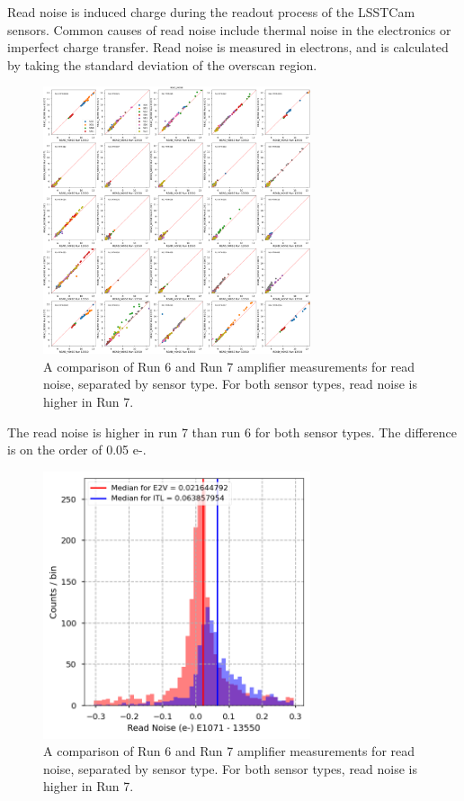 Read noise is induced charge during the readout process of the LSSTCam sensors. Common causes of read noise include thermal noise in the electronics or imperfect charge transfer. Read noise is measured in electrons, and is calculated by taking the standard deviation of the overscan region.

\begin{figure}[ht]
\begin{centering}
\includegraphics[width=0.7\textwidth]{figures/baselineCharacterization/13550_E1071_READ_NOISE_inset.png}
\caption{A comparison of Run 6 and Run 7 amplifier measurements for read noise, separated by sensor type. For both sensor types, read noise is higher in Run 7.}
\end{centering}
\end{figure}

The read noise is higher in run 7 than run 6 for both sensor types. The difference is on the order of 0.05 e-.

\begin{figure}[ht]
\begin{centering}
\includegraphics[width=0.7\textwidth]{figures/baselineCharacterization/ReadNoisee-_13550_E1071_diff.png}
\caption{A comparison of Run 6 and Run 7 amplifier measurements for read noise, separated by sensor type. For both sensor types, read noise is higher in Run 7.}
\end{centering}
\end{figure}

